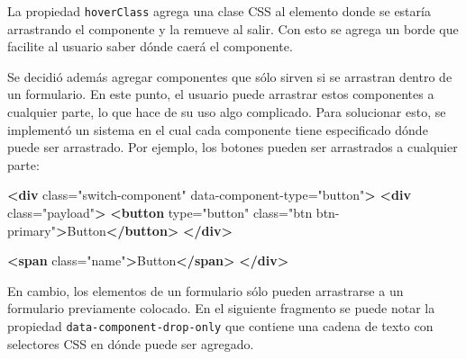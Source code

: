 \documentclass[12pt,spanish,letter]{report}
\newenvironment{Shaded}{}{}
\newcommand{\KeywordTok}[1]{\textcolor[rgb]{0.00,0.44,0.13}{\textbf{{#1}}}}
\newcommand{\StringTok}[1]{\textcolor[rgb]{0.25,0.44,0.63}{{#1}}}
\newcommand{\CommentTok}[1]{\textcolor[rgb]{0.38,0.63,0.69}{\textit{{#1}}}}
\newcommand{\OtherTok}[1]{\textcolor[rgb]{0.00,0.44,0.13}{{#1}}}
\newcommand{\NormalTok}[1]{{#1}}
\begin{document}
\begin{Shaded}
\end{Shaded}

La propiedad \texttt{hoverClass} agrega una clase CSS al elemento donde
se estaría arrastrando el componente y la remueve al salir. Con esto se
agrega un borde que facilite al usuario saber dónde caerá el componente.

Se decidió además agregar componentes que sólo sirven si se arrastran
dentro de un formulario. En este punto, el usuario puede arrastrar estos
componentes a cualquier parte, lo que hace de su uso algo complicado.
Para solucionar esto, se implementó un sistema en el cual cada
componente tiene especificado dónde puede ser arrastrado. Por ejemplo,
los botones pueden ser arrastrados a cualquier parte:

\begin{Shaded}
\begin{Highlighting}[]
\KeywordTok{<div}\OtherTok{ class=}\StringTok{"switch-component"}\OtherTok{ data-component-type=}\StringTok{"button"}\KeywordTok{>}
  \KeywordTok{<div}\OtherTok{ class=}\StringTok{"payload"}\KeywordTok{>}
    \KeywordTok{<button}\OtherTok{ type=}\StringTok{"button"}\OtherTok{ class=}\StringTok{"btn btn-primary"}\KeywordTok{>}\NormalTok{Button}\KeywordTok{</button>}
  \KeywordTok{</div>}

  \KeywordTok{<span}\OtherTok{ class=}\StringTok{"name"}\KeywordTok{>}\NormalTok{Button}\KeywordTok{</span>}
\KeywordTok{</div>}
\end{Highlighting}
\end{Shaded}

En cambio, los elementos de un formulario sólo pueden arrastrarse a un
formulario previamente colocado. En el siguiente fragmento se puede
notar la propiedad \texttt{data-component-drop-only} que contiene una
cadena de texto con selectores CSS en dónde puede ser agregado.
\end{document}
